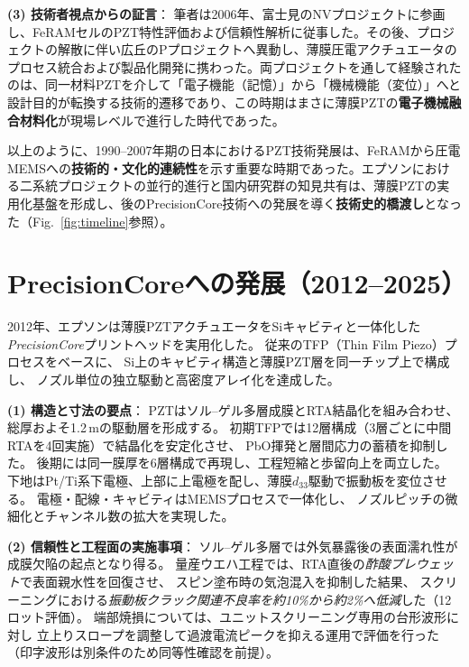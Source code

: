 \documentclass[conference]{IEEEtran}
\begin{document}
\medskip
\noindent
\textbf{(3) 技術者視点からの証言}：
筆者は2006年、富士見のNVプロジェクトに参画し、FeRAMセルのPZT特性評価および信頼性解析に従事した。その後、プロジェクトの解散に伴い広丘のPプロジェクトへ異動し、薄膜圧電アクチュエータのプロセス統合および製品化開発に携わった。両プロジェクトを通して経験されたのは、同一材料PZTを介して「電子機能（記憶）」から「機械機能（変位）」へと設計目的が転換する技術的遷移であり、この時期はまさに薄膜PZTの\textbf{電子機械融合材料化}が現場レベルで進行した時代であった。

\medskip
以上のように、1990--2007年期の日本におけるPZT技術発展は、FeRAMから圧電MEMSへの\textbf{技術的・文化的連続性}を示す重要な時期であった。エプソンにおける二系統プロジェクトの並行的進行と国内研究群の知見共有は、薄膜PZTの実用化基盤を形成し、後のPrecisionCore技術への発展を導く\textbf{技術史的橋渡し}となった（Fig.~\ref{fig:timeline}参照）。

\section{PrecisionCoreへの発展（2012--2025）}
2012年、エプソンは薄膜PZTアクチュエータをSiキャビティと一体化した
\textit{PrecisionCore}プリントヘッドを実用化した\cite{uemura2014mems}。
従来のTFP（Thin Film Piezo）プロセスをベースに、
Si上のキャビティ構造と薄膜PZT層を同一チップ上で構成し、
ノズル単位の独立駆動と高密度アレイ化を達成した。

\medskip
\noindent
\textbf{(1) 構造と寸法の要点}：
PZTはソル--ゲル多層成膜とRTA結晶化を組み合わせ、
総厚およそ1.2\,\textmu mの駆動層を形成する。
初期TFPでは12層構成（3層ごとに中間RTAを4回実施）で結晶化を安定化させ、
PbO揮発と層間応力の蓄積を抑制した。
後期には同一膜厚を6層構成で再現し、工程短縮と歩留向上を両立した。
下地はPt/Ti系下電極、上部に上電極を配し、薄膜$d_{33}$駆動で振動板を変位させる。
電極・配線・キャビティはMEMSプロセスで一体化し、
ノズルピッチの微細化とチャンネル数の拡大を実現した\cite{uemura2014mems,epson_wp_precisioncore}。

\medskip
\noindent
\textbf{(2) 信頼性と工程面の実施事項}：
ソル--ゲル多層では外気暴露後の表面濡れ性が成膜欠陥の起点となり得る。
量産ウエハ工程では、RTA直後の\emph{酢酸プレウェット}で表面親水性を回復させ、
スピン塗布時の気泡混入を抑制した結果、
スクリーニングにおける\emph{振動板クラック関連不良率を約10\%から約2\%へ低減}した（12ロット評価）。
端部焼損については、ユニットスクリーニング専用の台形波形に対し
立上りスロープを調整して過渡電流ピークを抑える運用で評価を行った
（印字波形は別条件のため同等性確認を前提）。
\end{document}
